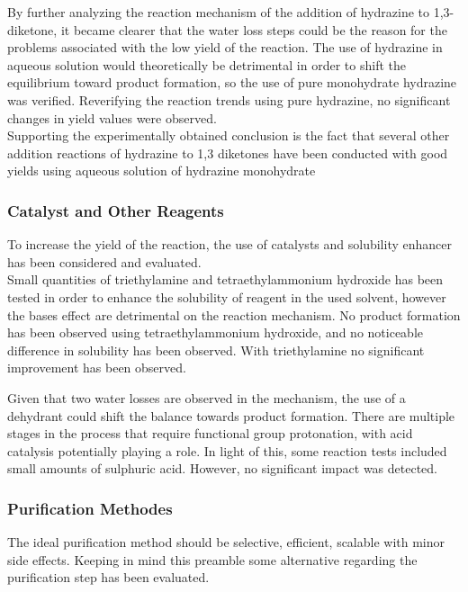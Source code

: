 \documentclass[../Master.tex]{subfiles}
\begin{document}
By further analyzing the reaction mechanism of the addition of hydrazine to 1,3-diketone, it became clearer that the water loss steps could be the reason for the problems associated with the low yield of the reaction. The use of hydrazine in aqueous solution would theoretically be detrimental in order to shift the equilibrium toward product formation, so the use of pure monohydrate hydrazine was verified.
Reverifying the reaction trends using pure hydrazine, no significant changes in yield values were observed.\\
Supporting the experimentally obtained conclusion is the fact that several other addition reactions of hydrazine to 1,3 diketones have been conducted with good yields using aqueous solution of hydrazine monohydrate

\subsubsection{Catalyst and Other Reagents}\label{sec:cat-other-reagents}

To increase the yield of the reaction, the use of catalysts and solubility enhancer has been considered and evaluated. \\
Small quantities of triethylamine and tetraethylammonium hydroxide has been tested in order to enhance the solubility of reagent in the used solvent, however the bases effect are detrimental on the reaction mechanism. No product formation has been observed using tetraethylammonium hydroxide, and no noticeable difference in solubility has been observed. With triethylamine no significant improvement has been observed.

Given that two water losses are observed in the mechanism, the use of a dehydrant could shift the balance towards product formation. There are multiple stages in the process that require functional group protonation, with acid catalysis potentially playing a role.
In light of this, some reaction tests included small amounts of sulphuric acid. However, no significant impact was detected.

\subsubsection{Purification Methodes}\label{sec:pyr-purification}

The ideal purification method should be selective, efficient, scalable with minor side effects. Keeping in mind this preamble some alternative regarding the purification step has been evaluated.
\end{document}
